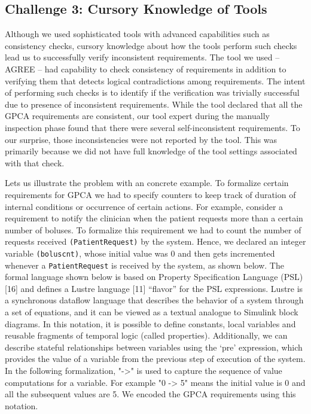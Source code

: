 \subsection{Challenge 3: Cursory Knowledge of Tools}

Although we used sophisticated tools with advanced capabilities such as consistency checks, cursory knowledge about how the tools perform such checks lead us to successfully verify inconsistent requirements. The tool we used -- AGREE -- had capability to check consistency of requirements in addition to verifying them that detects logical contradictions among requirements. The intent of performing such checks is to identify if the verification was trivially successful due to presence of inconsistent requirements. While the tool declared that all the GPCA requirements are consistent, our tool expert during the manually inspection phase found that there were several self-inconsistent requirements. To our surprise, those inconsistencies were not reported by the tool. This was primarily because we did not have full knowledge of the tool settings associated with that check.

Lets us illustrate the problem with an concrete example. To formalize certain requirements for GPCA we had to specify counters to keep track of duration of internal conditions or occurrence of certain actions. For example, consider a requirement to notify the clinician when the patient requests more than a certain number of boluses. To formalize this requirement we had to count the number of requests received \texttt{(PatientRequest)} by the system. Hence, we declared an integer variable \texttt{(boluscnt)}, whose initial value was 0 and then gets incremented whenever a \texttt{PatientRequest} is received by the system, as shown below. The formal language shown below is based on Property Specification Language (PSL) [16] and defines a Lustre language
[11] “flavor” for the PSL expressions. Lustre is a synchronous dataflow language that describes the behavior of a system through a set of equations, and it can be viewed as a textual analogue to Simulink block diagrams. In this notation, it is possible to define constants, local variables and reusable fragments of temporal logic (called properties). Additionally, we can describe stateful relationships between variables using
the `pre' expression, which provides the value of a variable from the previous step of execution of the system. In the following formalization, "->" is used to capture the sequence of value computations for a variable. For example "0 -> 5" means the initial value is 0 and all the subsequent values are 5. We encoded the GPCA requirements using this notation.

